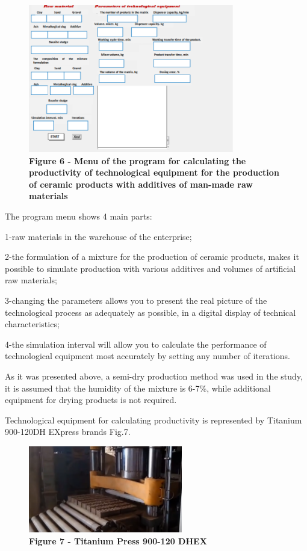 \begin{figure}[H]
	\centering
	\includegraphics[width=0.8\textwidth]{assets/272}
	\caption*{\bfseries Figure 6 - Menu of the program for calculating the productivity of technological equipment for the production of ceramic
	products with additives of man-made raw materials}
\end{figure}





The program menu shows 4 main parts:

1-raw materials in the warehouse of the enterprise;

2-the formulation of a mixture for the production of ceramic products,
makes it possible to simulate production with various additives and
volumes of artificial raw materials;

3-changing the parameters allows you to present the real picture of the
technological process as adequately as possible, in a digital display of
technical characteristics;

4-the simulation interval will allow you to calculate the performance of
technological equipment most accurately by setting any number of
iterations.

As it was presented above, a semi-dry production method was used in the
study, it is assumed that the humidity of the mixture is 6-7\%, while
additional equipment for drying products is not required.

Technological equipment for calculating productivity is represented by
Titanium 900-120DH EXpress brands Fig.7.

\begin{figure}[H]
	\centering
	\includegraphics[width=0.6\textwidth]{assets/273}
	\caption*{\bfseries Figure 7 - Titanium Press 900-120 DHEX}
\end{figure}



